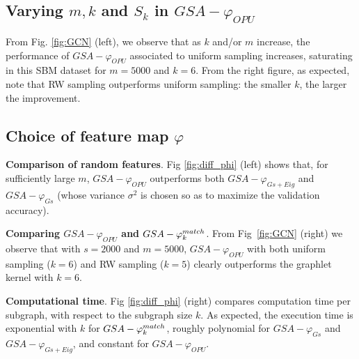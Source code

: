 \documentclass{article}
\begin{document}
\subsection{Varying $m, k$ and $S_k$ in $GSA-{\varphi_{OPU}}$}
From Fig. \ref{fig:GCN} (left), we observe that as $k$ and/or $m$ increase, the performance of $GSA-{\varphi_{OPU}}$ associated to uniform sampling increases, saturating in this SBM dataset for $m=5000$ and $k=6$. From the right figure, as expected, note that RW sampling outperforms uniform sampling: the smaller $k$, the larger the improvement.

\subsection{Choice of feature map $\varphi$}
\textbf{Comparison of random features}. Fig \ref{fig:diff_phi} (left) shows  that, for sufficiently large $m$, $GSA-\varphi_{OPU}$  outperforms both $GSA-\varphi_{Gs+Eig}$  and $GSA-\varphi_{Gs}$ (whose variance $\sigma^2$ is chosen so as to maximize the validation accuracy). %

\noindent\textbf{Comparing $GSA-\varphi_{OPU}$ and $GSA-\varphi^{match}_k$}. From Fig~\ref{fig:GCN} (right) we observe that with $s=2000$ and $m=5000$, $GSA-\varphi_{OPU}$ with both uniform sampling ($k=6$) and RW sampling ($k=5$)  clearly outperforms the graphlet kernel %
with $k=6$. %

\noindent\textbf{Computational time}. Fig \ref{fig:diff_phi} (right) compares computation time per subgraph, with respect to the subgraph size $k$. %
As expected, the execution time is exponential with $k$ for $GSA-\varphi^{match}_k$, roughly polynomial for $GSA-\varphi_{Gs}$ and $GSA-\varphi_{Gs+Eig}$, and constant for $GSA-\varphi_{OPU}$.%
\end{document}

